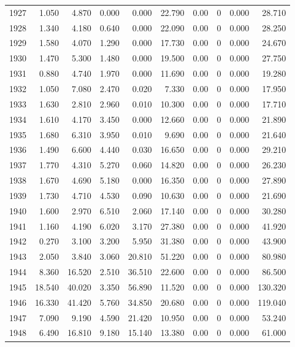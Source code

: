 \documentclass[
]{scrartcl}
\begin{document}
\begin{landscape}
\begin{longtable}{rrrrrrrrrr}
1927 & 1.050 & 4.870 & 0.000 & 0.000 & 22.790 & 0.00 & 0 & 0.000 & 28.710 \\ 
1928 & 1.340 & 4.180 & 0.640 & 0.000 & 22.090 & 0.00 & 0 & 0.000 & 28.250 \\ 
1929 & 1.580 & 4.070 & 1.290 & 0.000 & 17.730 & 0.00 & 0 & 0.000 & 24.670 \\ 
1930 & 1.470 & 5.300 & 1.480 & 0.000 & 19.500 & 0.00 & 0 & 0.000 & 27.750 \\ 
1931 & 0.880 & 4.740 & 1.970 & 0.000 & 11.690 & 0.00 & 0 & 0.000 & 19.280 \\ 
1932 & 1.050 & 7.080 & 2.470 & 0.020 & 7.330 & 0.00 & 0 & 0.000 & 17.950 \\ 
1933 & 1.630 & 2.810 & 2.960 & 0.010 & 10.300 & 0.00 & 0 & 0.000 & 17.710 \\ 
1934 & 1.610 & 4.170 & 3.450 & 0.000 & 12.660 & 0.00 & 0 & 0.000 & 21.890 \\ 
1935 & 1.680 & 6.310 & 3.950 & 0.010 & 9.690 & 0.00 & 0 & 0.000 & 21.640 \\ 
1936 & 1.490 & 6.600 & 4.440 & 0.030 & 16.650 & 0.00 & 0 & 0.000 & 29.210 \\ 
1937 & 1.770 & 4.310 & 5.270 & 0.060 & 14.820 & 0.00 & 0 & 0.000 & 26.230 \\ 
1938 & 1.670 & 4.690 & 5.180 & 0.000 & 16.350 & 0.00 & 0 & 0.000 & 27.890 \\ 
1939 & 1.730 & 4.710 & 4.530 & 0.090 & 10.630 & 0.00 & 0 & 0.000 & 21.690 \\ 
1940 & 1.600 & 2.970 & 6.510 & 2.060 & 17.140 & 0.00 & 0 & 0.000 & 30.280 \\ 
1941 & 1.160 & 4.190 & 6.020 & 3.170 & 27.380 & 0.00 & 0 & 0.000 & 41.920 \\ 
1942 & 0.270 & 3.100 & 3.200 & 5.950 & 31.380 & 0.00 & 0 & 0.000 & 43.900 \\ 
1943 & 2.050 & 3.840 & 3.060 & 20.810 & 51.220 & 0.00 & 0 & 0.000 & 80.980 \\ 
1944 & 8.360 & 16.520 & 2.510 & 36.510 & 22.600 & 0.00 & 0 & 0.000 & 86.500 \\ 
1945 & 18.540 & 40.020 & 3.350 & 56.890 & 11.520 & 0.00 & 0 & 0.000 & 130.320 \\ 
1946 & 16.330 & 41.420 & 5.760 & 34.850 & 20.680 & 0.00 & 0 & 0.000 & 119.040 \\ 
1947 & 7.090 & 9.190 & 4.590 & 21.420 & 10.950 & 0.00 & 0 & 0.000 & 53.240 \\ 
1948 & 6.490 & 16.810 & 9.180 & 15.140 & 13.380 & 0.00 & 0 & 0.000 & 61.000 \\ 

\end{longtable}
\end{landscape}
\end{document}
